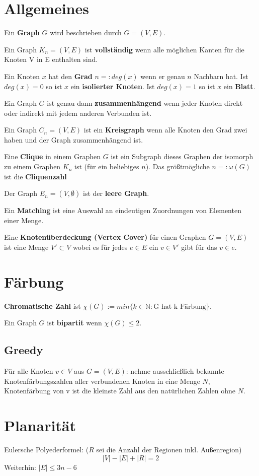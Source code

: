 \documentclass[10pt,a4paper]{article}
\begin{document}
\section{Allgemeines}
Ein \textbf{Graph} $G$ wird beschrieben durch $G = (V, E)$.

Ein Graph $K_n = (V, E)$ ist \textbf{vollständig} wenn alle möglichen Kanten für die Knoten V in E enthalten sind.

Ein Knoten $x$ hat den \textbf{Grad} $n =: deg(x)$ wenn er genau $n$ Nachbarn hat. Ist $deg(x) = 0$ so ist $x$ ein \textbf{isolierter Knoten}. Ist $deg(x) = 1$ so ist $x$ ein \textbf{Blatt}. 

Ein Graph $G$ ist genau dann \textbf{zusammenhängend} wenn jeder Knoten direkt oder indirekt mit jedem anderen Verbunden ist.

Ein Graph $C_n = (V, E)$ ist ein \textbf{Kreisgraph} wenn alle Knoten den Grad zwei haben und der Graph zusammenhängend ist.

Eine \textbf{Clique} in einem Graphen $G$ ist ein Subgraph dieses Graphen der isomorph zu einem Graphen $K_n$ ist (für ein beliebiges $n$). Das größtmögliche $n =: \omega(G)$ ist die \textbf{Cliquenzahl}

Der Graph $E_n = (V, \emptyset)$ ist der \textbf{leere Graph}.

Ein \textbf{Matching} ist eine Auswahl an eindeutigen Zuordnungen von Elementen einer Menge.

Eine \textbf{Knotenüberdeckung (Vertex Cover)} für einen Graphen $G = (V, E)$ ist eine Menge $V' \subset V$ wobei es für jedes $e \in E$ ein $v \in V'$ gibt für das $v \in e$.
\section{Färbung}
\textbf{Chromatische Zahl} ist $\chi(G) := min\lbrace k \in \mathbb{N} : \mbox{G hat k Färbung} \rbrace$.

Ein Graph $G$ ist \textbf{bipartit} wenn $\chi(G) \leq 2$.
\subsection{Greedy}
Für alle Knoten $v \in V$ aus $G = (V, E)$: nehme ausschließlich bekannte Knotenfärbungszahlen aller verbundenen Knoten in eine Menge $N$, Knotenfärbung von v ist die kleinste Zahl aus den natürlichen Zahlen ohne $N$.
\section{Planarität}
Eulersche Polyederformel: ($R$ sei die Anzahl der Regionen inkl. Außenregion)
\[|V|-|E|+|R|=2\]
Weiterhin: $|E| \leq 3n -6$
\end{document}
